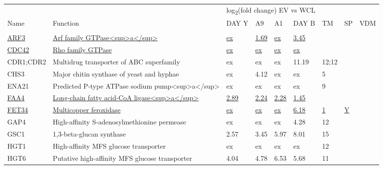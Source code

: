 \begin{ThreePartTable}
\begin{longtable}[t]{lllllllll}
\toprule
\multicolumn{2}{c}{ } & \multicolumn{4}{c}{log\textsubscript{2}(fold change) EV vs WCL} & \multicolumn{2}{c}{ } \\
\cmidrule(l{3pt}r{3pt}){3-6}
Name & Function & DAY Y & A9 & A1 & DAY B & TM & SP & VDM\\
\midrule
\addlinespace[0.3em]
\multicolumn{9}{l}{\textbf{Plasma membrane}}\\
\hspace{1em}\underline{ARF3} & \underline{Arf family GTPase<sup>a</sup>} & \underline{ex} & \underline{1.69} & \underline{ex} & \underline{3.45} & \underline{} & \underline{} & \underline{}\\
\hspace{1em}\underline{CDC42} & \underline{Rho family GTPase} & \underline{ex} & \underline{ex} & \underline{ex} & \underline{ex} & \underline{} & \underline{} & \underline{}\\
\hspace{1em}CDR1;CDR2 & Multidrug transporter of ABC superfamily & ex & ex & ex & 11.19 & 12;12 &  & \\
\hspace{1em}CHS3 & Major chitin synthase of yeast and hyphae & ex & 4.12 & ex & ex & 5 &  & \\
\hspace{1em}ENA21 & Predicted P-type ATPase sodium pump<sup>a</sup> & ex & ex & ex & ex & 9 &  & \\
\hspace{1em}\underline{FAA4} & \underline{Long-chain fatty acid-CoA ligase<sup>a</sup>} & \underline{2.89} & \underline{2.24} & \underline{2.28} & \underline{1.45} & \underline{} & \underline{} & \underline{}\\
\hspace{1em}\underline{FET34} & \underline{Multicopper feroxidase} & \underline{ex} & \underline{ex} & \underline{ex} & \underline{6.18} & \underline{1} & \underline{Y} & \underline{}\\
\hspace{1em}GAP4 & High-affinity S-adenosylmethionine permease & ex & ex & ex & 4.28 & 12 &  & \\
\hspace{1em}GSC1 & 1,3-beta-glucan synthase & 2.57 & 3.45 & 5.97 & 8.01 & 15 &  & \\
\hspace{1em}HGT1 & High-affinity MFS glucose transporter & ex & ex & ex & ex & 12 &  & \\
\hspace{1em}HGT6 & Putative high-affinity MFS glucose transporter & 4.04 & 4.78 & 6.53 & 5.68 & 11 &  & \\

\end{longtable}
\end{ThreePartTable}
